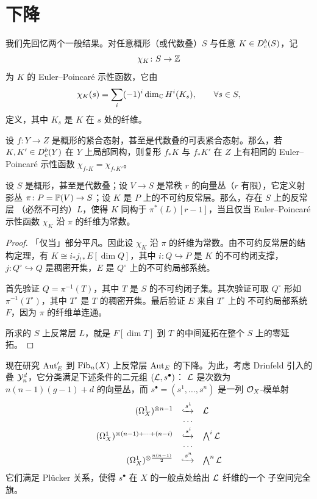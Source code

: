 \section{下降}

我们先回忆两个一般结果。对任意概形（或代数叠）$S$ 与任意 $K \in D^{b}_{c}(S)$，记
\[
  \chi_K \colon S \to \mathbb{Z}
\]
为 $K$ 的 Euler--Poincar\'e 示性函数，它由
\[
  \chi_K(s) = \sum_i (-1)^i \dim_{\mathbb{C}} H^i(K_s), \qquad \forall s \in S,
\]
定义，其中 $K_s$ 是 $K$ 在 $s$ 处的纤维。

\begin{lemma}[Deligne, {[Il]} 推论 2.10]
设 $f \colon Y \to Z$ 是概形的紧合态射，甚至是代数叠的可表紧合态射。那么，若
$K, K' \in D^{b}_{c}(Y)$ 在 $Y$ 上局部同构，则复形 $f_*K$ 与 $f_*K'$ 在 $Z$ 上有相同的
Euler--Poincar\'e 示性函数 $\chi_{f_*K} = \chi_{f_*K'}$。
\end{lemma}

\begin{lemma}
设 $S$ 是概形，甚至是代数叠；设 $V \to S$ 是常秩 $r$ 的向量丛（$r$ 有限），它定义射影丛
$\pi \colon P = \mathbb{P}(V) \to S$；设 $K$ 是 $P$ 上的不可约反常层。那么，存在 $S$ 上的反常层
（必然不可约）$L$，使得 $K$ 同构于 $\pi^*(L)[r-1]$，当且仅当
Euler--Poincar\'e 示性函数 $\chi_K$ 沿 $\pi$ 的纤维为常数。
\end{lemma}

\begin{proof}
「仅当」部分平凡。因此设 $\chi_K$ 沿 $\pi$ 的纤维为常数。由不可约反常层的结构定理，有
$K \cong i_* j_{!*} E[\dim Q]$，其中 $i \colon Q \hookrightarrow P$ 是 $K$ 的不可约闭支撑，
$j \colon Q^\circ \hookrightarrow Q$ 是稠密开集，$E$ 是 $Q^\circ$ 上的不可约局部系统。

首先验证 $Q = \pi^{-1}(T)$，其中 $T$ 是 $S$ 的不可约闭子集。其次验证可取 $Q^\circ$ 形如
$\pi^{-1}(T^\circ)$，其中 $T^\circ$ 是 $T$ 的稠密开集。最后验证 $E$ 来自 $T^\circ$ 上的
不可约局部系统 $F$，因为 $\pi$ 的纤维单连通。

所求的 $S$ 上反常层 $L$，就是 $F[\dim T]$ 到 $T$ 的中间延拓在整个 $S$ 上的零延拓。
\end{proof}

现在研究 $\operatorname{Aut}'_E$ 到 $\operatorname{Fib}_n(X)$ 上反常层 $\operatorname{Aut}_E$ 的下降。为此，考虑 Drinfeld 引入的叠
$\mathcal{Y}^d_n$，它分类满足下述条件的二元组 $(\mathcal{L}, s^\bullet)$：
$\mathcal{L}$ 是次数为 $n(n-1)(g-1)+d$ 的向量丛，而
$s^\bullet = (s^1, \dots, s^n)$ 是一列 $\mathcal{O}_X$-模单射
\[
\begin{array}{rcl}
(\Omega^{1}_{X})^{\otimes n-1} & \xhookrightarrow{s^1} & \mathcal{L} \\
 & \cdots & \\
(\Omega^{1}_{X})^{\otimes (n-1)+\cdots+(n-i)} & \xhookrightarrow{s^i} & \bigwedge^i \mathcal{L} \\
 & \cdots & \\
(\Omega^{1}_{X})^{\otimes \frac{n(n-1)}{2}} & \xhookrightarrow{s^n} & \bigwedge^n \mathcal{L}
\end{array}
\]
它们满足 Pl\"ucker 关系，使得 $s^\bullet$ 在 $X$ 的一般点处给出 $\mathcal{L}$ 纤维的一个
子空间完全旗。

